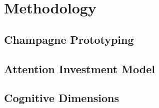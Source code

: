 \section{Methodology}

\subsection{Champagne Prototyping}

\subsection{Attention Investment Model}

\subsection{Cognitive Dimensions}